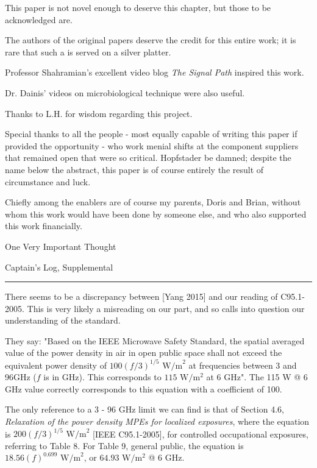 \documentclass[fleqn,10pt]{article}
\begin{document}
This paper is not novel enough to deserve this chapter, but those to be acknowledged are.

The authors of the original papers deserve the credit for this entire work; it is rare that such a is served on a silver platter.

Professor Shahramian's excellent video blog {\it The Signal Path} inspired this work. 

Dr. Dainis' videos on microbiological technique were also useful.

Thanks to L.H. for wisdom regarding this project.

Special thanks to all the people - most equally capable of writing this paper if provided the opportunity - who work menial shifts at the component suppliers that remained open that were so critical. Hopfstader be damned; despite the name below the abstract, this paper is of course entirely the result of circumstance and luck. 

Chiefly among the enablers are of course my parents, Doris and Brian, without whom this work would have been done by someone else, and who also supported this work financially. 



One Very Important Thought













\clearpage
{\Large Captain's Log, Supplemental}\\

\rule{\linewidth}{0.2pt}

There seems to be a discrepancy between [Yang 2015] and our reading of C95.1-2005. This is very likely a misreading on our part, and so calls into question our understanding of the standard.

They say: "Based on the IEEE Microwave Safety Standard, the spatial averaged value of the power density in air in open public space shall not exceed the equivalent power density of $100(f/3)^{1/5} \text{ W/m}^2$ at frequencies between 3 and 96GHz ($f$ is in GHz). This corresponds to $115 \text{ W}/\text{m}^2$ at 6 GHz". The 115 W @ 6 GHz value correctly corresponds to this equation with a coefficient of 100.

The only reference to a 3 - 96 GHz limit we can find is that of Section 4.6, {\it Relaxation of the power density MPEs for localized exposures}, where the equation is $200 (f/3)^{1/5} \text{ W/m}^2$ [IEEE C95.1-2005], for controlled occupational exposures, referring to Table 8. For Table 9, general public, the equation is $18.56 (f)^{0.699} \text{ W/m}^2$, or $64.93 \text{ W}/\text{m}^2$ @ 6 GHz. 
\end{document}
